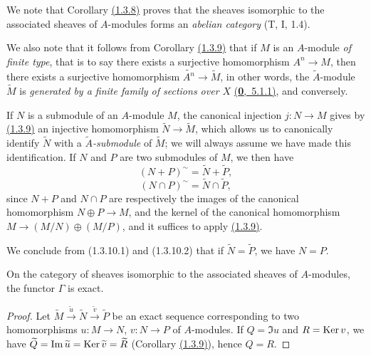 We note that Corollary \hyperref[cor-1.1.3.8]{(1.3.8)} proves that the sheaves isomorphic to the associated sheaves
of $A$-modules forms an {\it abelian category} (T, I, 1.4).

We also note that it follows from Corollary \hyperref[cor-1.1.3.9]{(1.3.9)} that if $M$ is an $A$-module {\it of
finite type}, that is to say there exists a surjective homomorphism $A^n\to M$, then there
exists a surjective homomorphism $\widetilde{A^n}\to\widetilde{M}$, in other words, the
$\widetilde{A}$-module $\widetilde{M}$ is {\it generated by a finite family of sections over
$X$} \hyperref[env-0.5.1.1]{(\textbf{0},~5.1.1)}, and conversely.

\begin{env}[1.3.10]
\label{env-1.1.3.10}
If $N$ is a submodule of an $A$-module $M$, the canonical injection $j:N\to M$ gives by
\hyperref[cor-1.1.3.9]{(1.3.9)} an injective homomorphism $\widetilde{N}\to\widetilde{M}$, which allows us
to canonically identify $\widetilde{N}$ with a {\it $\widetilde{A}$-submodule} of
$\widetilde{M}$; we will always assume we have made this identification. If $N$ and $P$ are
two submodules of $M$, we then have
\[
  (N+P)^\sim=\widetilde{N}+\widetilde{P},
  \tag{1.3.10.1}
\]
\[
  (N\cap P)^\sim=\widetilde{N}\cap\widetilde{P},
  \tag{1.3.10.2}
\]
since $N+P$ and $N\cap P$ are respectively the images of the canonical homomorphism
$N\oplus P\to M$, and the kernel of the canonical homomorphism $M\to(M/N)\oplus(M/P)$, and
it suffices to apply \hyperref[cor-1.1.3.9]{(1.3.9)}.

We conclude from (1.3.10.1) and (1.3.10.2) that if $\widetilde{N}=\widetilde{P}$, we have
$N=P$.
\end{env}

\begin{cor}[1.3.11]
\label{cor-1.1.3.11}
On the category of sheaves isomorphic to the associated sheaves of $A$-modules, the functor
$\Gamma$ is exact.
\end{cor}

\begin{proof}
\label{proof-cor-1.1.3.11}
Let $\widetilde{M}\xrightarrow{\widetilde{u}}\widetilde{N}
\xrightarrow{\widetilde{v}}\widetilde{P}$ be an exact sequence corresponding to two
homomorphisms $u:M\to N$, $v:N\to P$ of $A$-modules. If $Q=\Im u$ and $R={\mathop{\mathrm{Ker}}\nolimits}\, v$, we have
$\widetilde{Q}={\mathop{\mathrm{Im}}\nolimits}\,\widetilde{u}={\mathop{\mathrm{Ker}}\nolimits}\,\widetilde{v}=\widetilde{R}$ (Corollary \hyperref[cor-1.1.3.9]{(1.3.9)}),
hence $Q=R$.
\end{proof}


